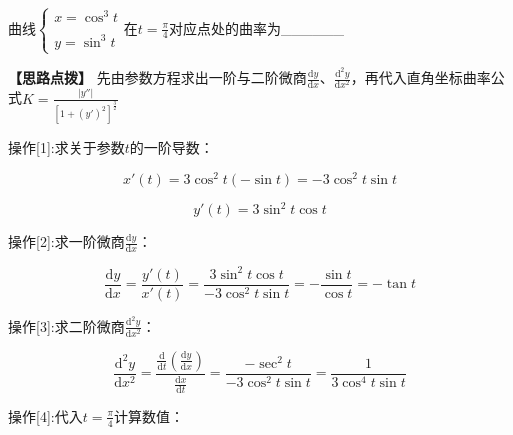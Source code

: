 \documentclass[11pt,a4paper,UTF8]{ctexart}
\begin{document}
曲线$\begin{cases} x = \cos^3 t \\\\ y = \sin^3 t \end{cases}$在$t = \frac{\pi}{4}$对应点处的曲率为\_\_\_\_\_\_

\textbf{\color{DeepPurple}【思路点拨】} 先由参数方程求出一阶与二阶微商$\frac{\mathrm{d}y}{\mathrm{d}x}$、$\frac{\mathrm{d}^2y}{\mathrm{d}x^2}$，再代入直角坐标曲率公式$K = \frac{\vert{}y''\vert{}}{\left[1 + (y')^2\right]^{\frac{3}{2}}}$


操作[1]:求关于参数$t$的一阶导数：

\begin{solbox}[分步推导与答题规范]

\begin{equation*}
x'(t) = 3\cos^2 t(-\sin t) = -3\cos^2 t \sin t
\end{equation*}



\begin{equation*}
y'(t) = 3\sin^2 t \cos t
\end{equation*}

\end{solbox}

操作[2]:求一阶微商$\frac{\mathrm{d}y}{\mathrm{d}x}$：

\begin{solbox}[分步推导与答题规范]

\begin{equation*}
\frac{\mathrm{d}y}{\mathrm{d}x} = \frac{y'(t)}{x'(t)} = \frac{3\sin^2 t \cos t}{-3\cos^2 t \sin t} = -\frac{\sin t}{\cos t} = -\tan t
\end{equation*}

\end{solbox}

操作[3]:求二阶微商$\frac{\mathrm{d}^2y}{\mathrm{d}x^2}$：

\begin{solbox}[分步推导与答题规范]

\begin{equation*}
\frac{\mathrm{d}^2y}{\mathrm{d}x^2} = \frac{\frac{\mathrm{d}}{\mathrm{d}t}\left(\frac{\mathrm{d}y}{\mathrm{d}x}\right)}{\frac{\mathrm{d}x}{\mathrm{d}t}} = \frac{-\sec^2 t}{-3\cos^2 t \sin t} = \frac{1}{3\cos^4 t \sin t}
\end{equation*}

\end{solbox}

操作[4]:代入$t = \frac{\pi}{4}$计算数值：
\end{document}
